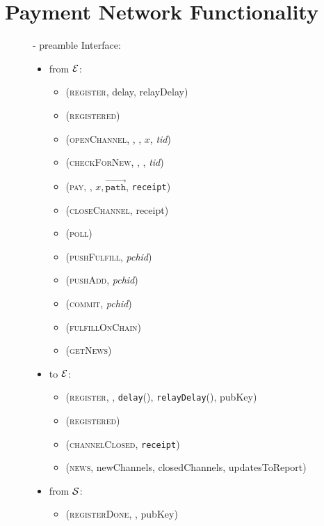 \section{Payment Network Functionality}
  \begin{figure}[H]
    \begin{systembox}{\fpaynet{} - preamble}
      Interface: 
      \begin{itemize}
        \item from $\mathcal{E}$:
        \begin{itemize}
          \item (\textsc{register}, delay, relayDelay)
          \item (\textsc{registered})
          \item (\textsc{openChannel}, \alice, \bob, $x$, \textit{tid})
          \item (\textsc{checkForNew}, \alice, \bob, \textit{tid})
          \item (\textsc{pay}, \bob, $x, \overrightarrow{\mathtt{path}}$,
          \texttt{receipt})
          \item (\textsc{closeChannel}, receipt)
          \item (\textsc{poll})
          \item (\textsc{pushFulfill}, \textit{pchid})
          \item (\textsc{pushAdd}, \textit{pchid})
          \item (\textsc{commit}, \textit{pchid})
          \item (\textsc{fulfillOnChain})
          \item (\textsc{getNews})
        \end{itemize}
        \item to $\mathcal{E}$:
        \begin{itemize}
          \item (\textsc{register}, \alice, \texttt{delay}(\alice),
          \texttt{relayDelay}(\alice), pubKey)
          \item (\textsc{registered})
          \item (\textsc{channelClosed}, \texttt{receipt})
          \item (\textsc{news}, newChannels, closedChannels, updatesToReport)
        \end{itemize}
        \item from $\mathcal{S}$:
        \begin{itemize}
          \item (\textsc{registerDone}, \alice, pubKey)

\end{itemize}
\end{itemize}
\end{systembox}
\end{figure}
